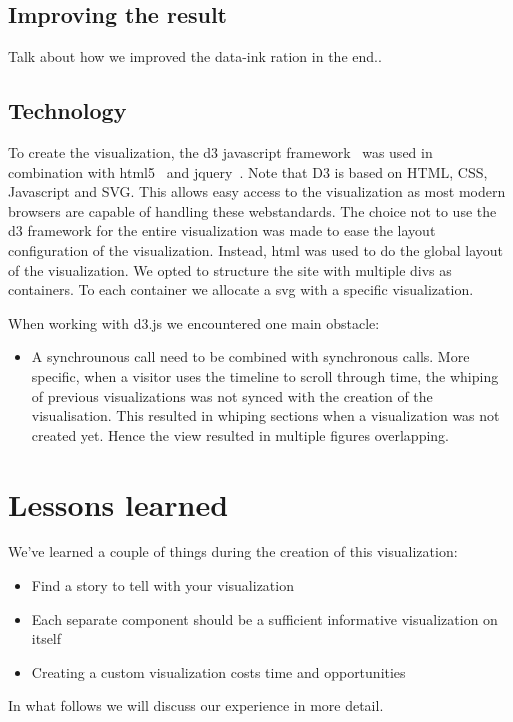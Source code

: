 \documentclass[chi_draft]{sigchi}
\begin{document}
\subsection{Improving the result}
Talk about how we improved the data-ink ration in the end..

\subsection{Technology}
To create the visualization, the d3 javascript framework~\cite{d3} was used in
combination with html5~\cite{html5} and jquery~\cite{jquery}. Note that D3 is
based on HTML, CSS, Javascript and SVG. This allows easy access to the
visualization as most modern browsers are capable of handling these
webstandards. The choice not to use the d3 framework for the entire
visualization was made to ease the layout configuration of the visualization.
Instead, html was used to do the global layout of the visualization. We opted to
structure the site with multiple divs as containers. To each container we
allocate a svg with a specific visualization.

When working with d3.js we encountered one main obstacle:
\begin{itemize}
        \item A synchrounous call need to be combined with synchronous calls.
            More specific, when a visitor uses the timeline to scroll through
            time, the whiping of previous visualizations was not synced with the
            creation of the visualisation. This resulted in whiping sections
            when a visualization was not created yet. Hence the view resulted in
            multiple figures overlapping.
\end{itemize}


\section{Lessons learned}\label{sec:lessonslearned}
We've learned a couple of things during the creation of this visualization:
\begin{itemize}
    \item Find a story to tell with your visualization
    \item Each separate component should be a sufficient informative visualization on itself
    \item Creating a custom visualization costs time and opportunities
\end{itemize}
In what follows we will discuss our experience in more detail.
\end{document}
